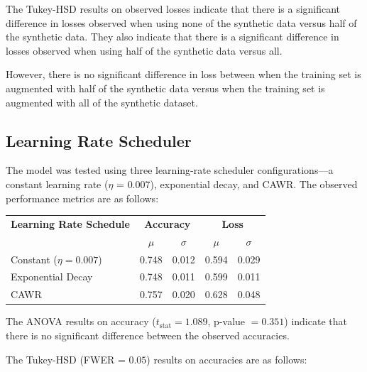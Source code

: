 The Tukey-HSD results on observed losses indicate that there is a significant difference in losses observed when using none of the synthetic data
versus half of the synthetic data. They also indicate that there is a significant difference in losses observed when using half of the synthetic
data versus all. 

However, there is no significant difference in loss between when the training set is augmented with half of the synthetic data
versus when the training set is augmented with all of the synthetic dataset.

\subsection{Learning Rate Scheduler}

The model was tested using three learning-rate scheduler configurations—a constant learning rate ($\eta$ = $0.007$), 
exponential decay, and CAWR. The observed performance metrics are as follows: \\

\noindent
\footnotesize
\setlength{\tabcolsep}{6pt} %
\renewcommand{\arraystretch}{1.0} %
\begin{center}
\begin{tabular}{l|cc|cc}
\toprule
\textbf{Learning Rate Schedule} & \multicolumn{2}{c|}{\textbf{Accuracy}} & \multicolumn{2}{c}{\textbf{Loss}} \\
\cmidrule(r){2-3} \cmidrule(l){4-5}
 & $\mu$ & $\sigma$ & $\mu$ & $\sigma$ \\
\midrule 
Constant ($\eta = 0.007$)  & 0.748 & 0.012 & 0.594 & 0.029 \\
Exponential Decay  & 0.748 & 0.011 & 0.599 & 0.011 \\
CAWR   & 0.757 & 0.020 & 0.628 & 0.048 \\
\bottomrule
\end{tabular}
\end{center}

\normalsize

\vspace{0.7em}


The ANOVA results on accuracy ($t_{\text{stat}} = 1.089$, 
p-value $= 0.351$) indicate that there is no significant difference between the observed accuracies.

The Tukey-HSD (FWER = $0.05$) results on accuracies are as follows: \\

